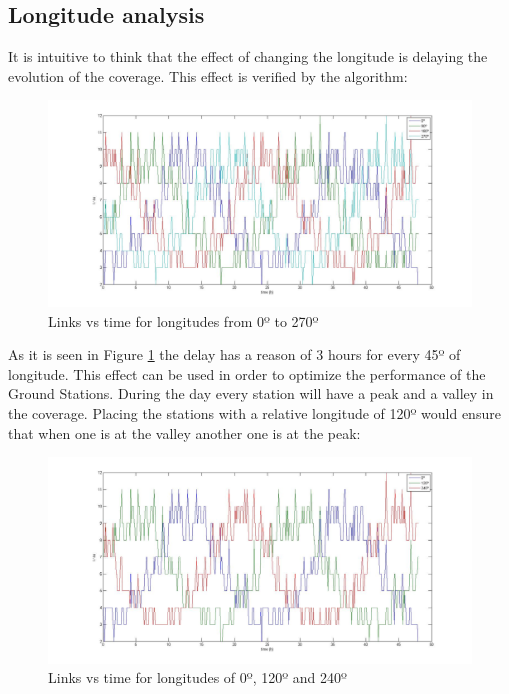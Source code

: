\subsection{Longitude analysis}
It is intuitive to think that the effect of changing the longitude is delaying the evolution of the coverage. This effect is verified by the algorithm:
\begin{figure}[H]
\begin{center}
\includegraphics[scale=0.30]{0_90_270_long.jpg}
\caption{Links vs time for longitudes from 0º to 270º}
\label{fig:long1}
\end{center}
\end{figure}
As it is seen in Figure \ref{fig:long1} the delay has a reason of 3 hours for every 45º of longitude. This effect can be used in order to optimize the performance of the Ground Stations. During the day every station will have a peak and a valley in the coverage. Placing the stations with a relative longitude of 120º would ensure that when one is at the valley another one is at the peak:
\begin{figure}[H]
\begin{center}
\includegraphics[scale=0.30]{0_120_240_long.jpg}
\caption{Links vs time for longitudes of 0º, 120º and 240º}
\label{fig:long2}
\end{center}
\end{figure}
